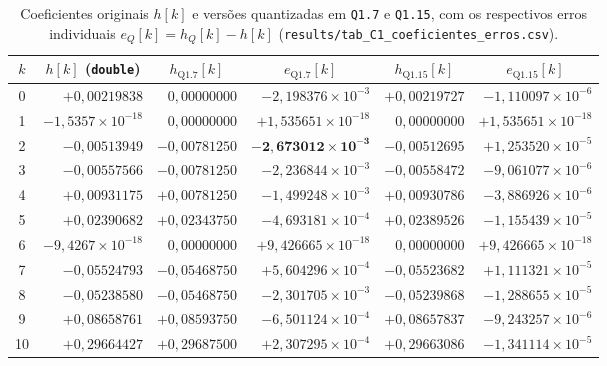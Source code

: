 \documentclass[11pt,a4paper]{article}
\begin{document}
\begin{table}[!htbp]
    \centering
    \caption{Coeficientes originais $h[k]$ e versões quantizadas em \texttt{Q1.7} e \texttt{Q1.15}, com os respectivos erros individuais $e_Q[k] = h_Q[k] - h[k]$ (\texttt{results/\allowbreak tab\_C1\_\allowbreak coeficientes\_erros.csv}).}
    \label{tab:C1_coeficientes}
    \footnotesize
    \setlength{\tabcolsep}{5pt}
    \begin{adjustbox}{max width=\textwidth}
    \begin{tabular}{@{}crrrrr@{}}
        \toprule
        \textbf{$k$} & \multicolumn{1}{c}{\textbf{$h[k]$ (\texttt{double})}} & \multicolumn{1}{c}{\textbf{$h_{\text{Q1.7}}[k]$}} & \multicolumn{1}{c}{\textbf{$e_{\text{Q1.7}}[k]$}} & \multicolumn{1}{c}{\textbf{$h_{\text{Q1.15}}[k]$}} & \multicolumn{1}{c}{\textbf{$e_{\text{Q1.15}}[k]$}} \\
        \midrule
        \rowcolor{rowfail}
        0  & $+0,00219838$ & $0,00000000$ & $-2,198376\times 10^{-3}$ & $+0,00219727$ & $-1,110097\times 10^{-6}$ \\
        1  & $-1,5357\times 10^{-18}$ & $0,00000000$ & $+1,535651\times 10^{-18}$ & $0,00000000$ & $+1,535651\times 10^{-18}$ \\
        2  & $-0,00513949$ & $-0,00781250$ & $\mathbf{-2,673012\times 10^{-3}}$ & $-0,00512695$ & $+1,253520\times 10^{-5}$ \\
        3  & $-0,00557566$ & $-0,00781250$ & $-2,236844\times 10^{-3}$ & $-0,00558472$ & $-9,061077\times 10^{-6}$ \\
        4  & $+0,00931175$ & $+0,00781250$ & $-1,499248\times 10^{-3}$ & $+0,00930786$ & $-3,886926\times 10^{-6}$ \\
        5  & $+0,02390682$ & $+0,02343750$ & $-4,693181\times 10^{-4}$ & $+0,02389526$ & $-1,155439\times 10^{-5}$ \\
        6  & $-9,4267\times 10^{-18}$ & $0,00000000$ & $+9,426665\times 10^{-18}$ & $0,00000000$ & $+9,426665\times 10^{-18}$ \\
        7  & $-0,05524793$ & $-0,05468750$ & $+5,604296\times 10^{-4}$ & $-0,05523682$ & $+1,111321\times 10^{-5}$ \\
        8  & $-0,05238580$ & $-0,05468750$ & $-2,301705\times 10^{-3}$ & $-0,05239868$ & $-1,288655\times 10^{-5}$ \\
        9  & $+0,08658761$ & $+0,08593750$ & $-6,501124\times 10^{-4}$ & $+0,08657837$ & $-9,243257\times 10^{-6}$ \\
        10 & $+0,29664427$ & $+0,29687500$ & $+2,307295\times 10^{-4}$ & $+0,29663086$ & $-1,341114\times 10^{-5}$ \\

\end{tabular}
\end{adjustbox}
\end{table}
\end{document}
